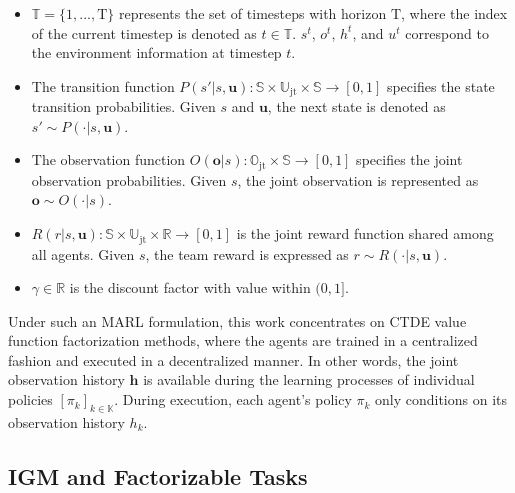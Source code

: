 \documentclass{article}
\newcommand{\statespace}{\mathbb{S}}
\newcommand{\state}{s}
\newcommand{\timespace}{\mathbb{T}}
\newcommand{\horizon}{\mathrm{T}}
\newcommand{\timestep}{t}
\newcommand{\jointactionspace}{\mathbb{U}}
\newcommand{\jointaction}{\mathbf{u}}
\newcommand{\action}{u}
\newcommand{\statetransitionfunction}{P}
\newcommand{\rewardfunction}{R}
\newcommand{\reward}{r}
\newcommand{\jointobservationspace}{\mathbb{O}}
\newcommand{\jointobservation}{\mathbf{o}}
\newcommand{\observation}{o}
\newcommand{\jointobservationhistory}{\mathbf{h}}
\newcommand{\observationhistory}{h}
\newcommand{\observationfunction}{O}
\newcommand{\agentspace}{\mathbb{K}}
\newcommand{\agentcounter}{k}
\newcommand{\discountfactor}{\gamma}
\newcommand{\policy}{\pi}
\newcommand{\joint}{\mathrm{jt}}
\begin{document}
\begin{itemize}
\item $\timespace{}=\{1,...,\horizon{}\}$ represents the set of timesteps with horizon $\horizon{}$, where the index of the current timestep is denoted as $\timestep{}\in\timespace{}$. $\state^{\timestep}$, $\observation^{\timestep}$, $\observationhistory^{\timestep}$, and $\action^{\timestep}$ correspond to the environment information at timestep $\timestep$.

\item The transition function $\statetransitionfunction{}(\state{}'|\state{},\jointaction{}):\statespace{}\times\jointactionspace_{\joint}\times \statespace{}\rightarrow[0,1]$ specifies the state transition probabilities. Given $\state$ and $\jointaction$, the next state is denoted as $\state{}'\sim\statetransitionfunction{}(\cdot|\state{},\jointaction{})$.

\item The observation function $\observationfunction{}({\jointobservation{}}|\state{}):\jointobservationspace_{\joint}\times\statespace{}\rightarrow[0,1]$ specifies the joint observation probabilities. Given $\state{}$, the joint observation is represented as $\jointobservation{}\sim\observationfunction{}(\cdot|\state{})$.

\item $\rewardfunction{}(\reward|\state{},\jointaction{}):\statespace{}\times\jointactionspace_{\joint}\times\mathbb{R}\rightarrow[0,1]$ is the joint reward function shared among all agents. Given $\state$, the team reward is expressed as $\reward\sim\rewardfunction{}(\cdot|\state{},\jointaction{})$.

\item $\discountfactor{}\in\mathbb{R}$ is the discount factor with value within $(0, 1]$.
\end{itemize}
Under such an MARL formulation, this work concentrates on CTDE value function factorization methods, where the agents are trained in a centralized fashion and executed in a decentralized manner. In other words, the joint observation history $\jointobservationhistory{}$ is available during the learning processes of individual policies $[\policy{}_{\agentcounter{}}]_{\agentcounter{}\in\agentspace{}}$. During execution, each agent's policy $\policy{}_{\agentcounter{}}$ only conditions on its observation history $\observationhistory{}_{\agentcounter{}}$.



\subsection{IGM and Factorizable Tasks}
\label{subsec:background_igm_and_factorizable_task}
\end{document}
